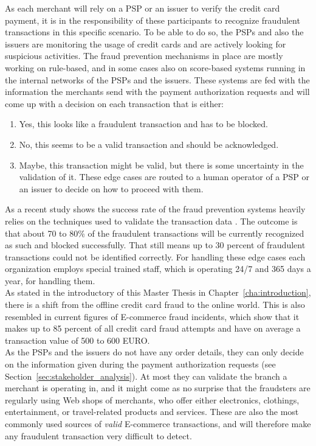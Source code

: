 As each merchant will rely on a \gls{PSP} or an issuer to verify the credit card payment, it is in the responsibility of these participants to recognize fraudulent transactions in this specific scenario. To be able to do so, the \gls{PSP}s and also the issuers are monitoring the usage of credit cards and are actively looking for suspicious activities. The fraud prevention mechanisms in place are mostly working on rule-based, and in some cases also on score-based systems running in the internal networks of the \gls{PSP}s and the issuers. These systems are fed with the information the merchants send with the payment authorization requests and will come up with a decision on each transaction that is either:\@

\begin{enumerate}
  \item Yes, this looks like a fraudulent transaction and has to be blocked.
  \item No, this seems to be a valid transaction and should be acknowledged.
  \item Maybe, this transaction might be valid, but there is some uncertainty in the validation of it. These edge cases are routed to a human operator of a \gls{PSP} or an issuer to decide on how to proceed with them.
\end{enumerate}

As a recent study shows the success rate of the fraud prevention systems heavily relies on the techniques used to validate the transaction data \citep{rana2015survey}. The outcome is that about 70 to 80\% of the fraudulent transactions will be currently recognized as such and blocked successfully. That still means up to 30 percent of fraudulent transactions could not be identified correctly. For handling these edge cases each organization employs special trained staff, which is operating 24/7 and 365 days a year, for handling them. \\

As stated in the introductory of this Master Thesis in Chapter~\ref{cha:introduction}, there is a shift from the offline credit card fraud to the online world. This is also resembled in current figures of \gls{E-commerce} fraud incidents, which show that it makes up to 85 percent of all credit card fraud attempts and have on average a transaction value of 500 to 600 EURO.\\

As the \gls{PSP}s and the issuers do not have any order details, they can only decide on the information given during the payment authorization requests (see Section~\ref{sec:stakeholder_analysis}). At most they can validate the branch a merchant is operating in, and it might come as no surprise that the fraudsters are regularly using Web shops of merchants, who offer either electronics, clothings, entertainment, or travel-related products and services. These are also the most commonly used sources of \emph{valid} \gls{E-commerce} transactions, and will therefore make any fraudulent transaction very difficult to detect. \\

